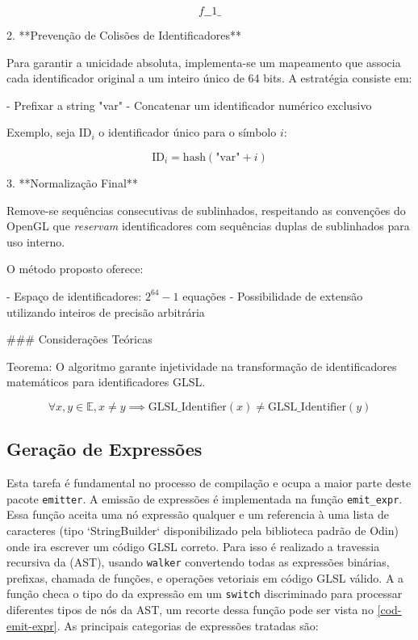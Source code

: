    \[ f\_\_1\_ \]

2. **Prevenção de Colisões de Identificadores**
   
   Para garantir a unicidade absoluta, implementa-se um mapeamento que associa cada identificador original a um inteiro único de 64 bits. A estratégia consiste em:
   
   - Prefixar a string "var"
   - Concatenar um identificador numérico exclusivo
   
   Exemplo, seja $\text{ID}_i$ o identificador único para o símbolo $i$:

   \[ \text{ID}_i = \text{hash}(\text{"var"} + i) \]

3. **Normalização Final**
   
   Remove-se sequências consecutivas de sublinhados, respeitando as convenções do OpenGL que \emph{reservam} identificadores com sequências duplas de sublinhados para uso interno.

O método proposto oferece:

- Espaço de identificadores: $2^{64} - 1$ equações
- Possibilidade de extensão utilizando inteiros de precisão arbitrária

### Considerações Teóricas

Teorema: O algoritmo garante injetividade na transformação de identificadores matemáticos para identificadores GLSL.

\[ \forall x, y \in \mathbb{E}, x \neq y \implies \text{GLSL\_Identifier}(x) \neq \text{GLSL\_Identifier}(y) \]

\subsection{Geração de Expressões}


Esta tarefa é fundamental no processo de compilação e ocupa a maior parte deste pacote \texttt{emitter}.
A emissão de expressões é implementada na função \verb`emit_expr`. Essa função aceita uma nó expressão qualquer e um referencia à uma lista de caracteres (tipo `StringBuilder` disponibilizado pela biblioteca padrão de Odin) onde ira escrever um código GLSL correto. Para isso é realizado a travessia recursiva da (AST), usando \texttt{walker} convertendo todas as expressões binárias, prefixas, chamada de funções,  e operações vetoriais em código GLSL válido. A a função checa o tipo do da expressão em um \verb`switch` discriminado para processar diferentes tipos de nós da AST, um recorte dessa função pode ser vista no \autoref{cod-emit-expr}. As principais categorias de expressões tratadas são:

